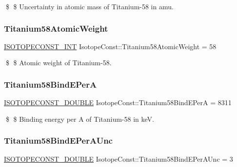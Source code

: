 \$ \$ Uncertainty in atomic mass of Titanium-\/58 in amu. \mbox{\label{group___isotope_const-_titanium-_ti58_gaa9f23f650a5c1faa51fc5d3f5936e3a3}} 
\subsubsection{\texorpdfstring{Titanium58\+Atomic\+Weight}{Titanium58AtomicWeight}}
{\footnotesize\ttfamily \mbox{\hyperlink{group___isotope_const-_macros_ga5f18360b3e99483a35c32d789e62621c}{I\+S\+O\+T\+O\+P\+E\+C\+O\+N\+S\+T\+\_\+\+I\+NT}} Isotope\+Const\+::\+Titanium58\+Atomic\+Weight = 58}

\$ \$ Atomic weight of Titanium-\/58. \mbox{\label{group___isotope_const-_titanium-_ti58_ga4af8ec068300caf09a281cd12981deca}} 
\subsubsection{\texorpdfstring{Titanium58\+Bind\+E\+PerA}{Titanium58BindEPerA}}
{\footnotesize\ttfamily \mbox{\hyperlink{group___isotope_const-_macros_ga8f45a7272ce02c0b4c65c44636ed719a}{I\+S\+O\+T\+O\+P\+E\+C\+O\+N\+S\+T\+\_\+\+D\+O\+U\+B\+LE}} Isotope\+Const\+::\+Titanium58\+Bind\+E\+PerA = 8311}

\$ \$ Binding energy per A of Titanium-\/58 in keV. \mbox{\label{group___isotope_const-_titanium-_ti58_ga30b9382809b343443e6ef269193ccb53}} 
\subsubsection{\texorpdfstring{Titanium58\+Bind\+E\+Per\+A\+Unc}{Titanium58BindEPerAUnc}}
{\footnotesize\ttfamily \mbox{\hyperlink{group___isotope_const-_macros_ga8f45a7272ce02c0b4c65c44636ed719a}{I\+S\+O\+T\+O\+P\+E\+C\+O\+N\+S\+T\+\_\+\+D\+O\+U\+B\+LE}} Isotope\+Const\+::\+Titanium58\+Bind\+E\+Per\+A\+Unc = 3}

